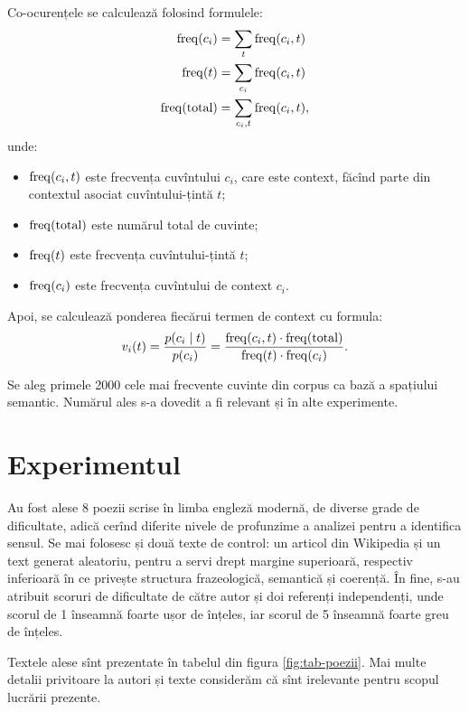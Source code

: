 Co-ocurențele se calculează folosind formulele:
\begin{align*}
  \mathrm{freq}(c_i) &= \displaystyle\sum_t \mathrm{freq}(c_i, t) \\
  \mathrm{freq}(t) &= \sum_{c_i} \mathrm{freq}(c_i, t) \\
  \mathrm{freq}(\text{total}) &= \sum_{c_i, t} \mathrm{freq}(c_i, t),
\end{align*}
unde:
\begin{itemize}
\item $ \mathrm{freq}(c_i, t) $ este frecvența cuvîntului $ c_i $, care este
  context, făcînd parte din contextul asociat cuvîntului-țintă $ t $;
\item $ \mathrm{freq}(\mathrm{total}) $ este numărul total de cuvinte;
\item $ \mathrm{freq}(t) $ este frecvența cuvîntului-țintă $ t $;
\item $ \mathrm{freq}(c_i) $ este frecvența cuvîntului de context $ c_i $.
\end{itemize}

Apoi, se calculează ponderea fiecărui termen de context cu formula:
\[
  v_i(t) = \dfrac{p(c_i \mid t)}{p(c_i)} = \dfrac{\dr{freq}(c_i, t) \cdot %
    \dr{freq}(\text{total})}{\dr{freq}(t) \cdot \dr{freq}(c_i)}.
\]

Se aleg primele 2000 cele mai frecvente cuvinte din corpus ca bază
a spațiului semantic. Numărul ales s-a dovedit a fi relevant și în
alte experimente.


\section{Experimentul}

Au fost alese 8 poezii scrise în limba engleză modernă, de diverse grade de
dificultate, adică cerînd diferite nivele de profunzime a analizei pentru
a identifica sensul. Se mai folosesc și două texte de control: un articol
din Wikipedia și un text generat aleatoriu, pentru a servi drept margine
superioară, respectiv inferioară în ce privește structura frazeologică,
semantică și coerență. În fine, s-au atribuit scoruri de dificultate de către
autor și doi referenți independenți, unde scorul de 1 înseamnă foarte ușor
de înțeles, iar scorul de 5 înseamnă foarte greu de înțeles.

Textele alese sînt prezentate în tabelul din figura \ref{fig:tab-poezii}.
Mai multe detalii privitoare la autori și texte considerăm că sînt irelevante
pentru scopul lucrării prezente.

